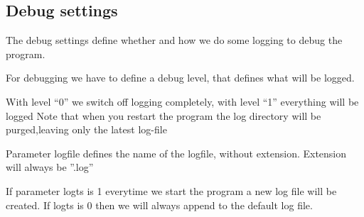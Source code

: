 \documentclass[a4paper,10pt,english]{sphinxmanual}
\begin{document}
\subsection{Debug settings}
\label{configuration:debug-settings}
The debug settings define whether and how we do some logging to debug the program.

For debugging we have to define a debug level, that defines what will be logged.

With level ``0'' we switch off logging completely, with level ``1'' everything will be logged
Note that  when you restart the program the log directory will be purged,leaving only the latest log-file

Parameter logfile defines the name of the logfile, without extension.
Extension will always be ''.log''

If parameter logts is 1 everytime we start the program a new log file will be created. If logts is 0 then we will always append to the default log file.
\end{document}
